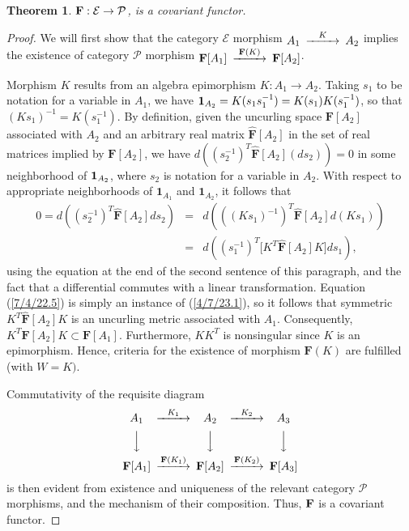 \documentclass{amsart}
\numberwithin{equation}{section}
\newtheorem{theorem}{Theorem}
\theoremstyle{definition}
\numberwithin{theorem}{section}
\begin{document}
\begin{theorem}\label{6/13/22.1}  ${\bf F}: \mathcal{E}\rightarrow \mathcal{P}$, is a covariant functor. 
 \end{theorem}
 \begin{proof}
We will first show that the category $\mathcal{E}$ morphism $ \begin{CD}  A_1 @>K>> A_2\end{CD}$ implies the existence of category $\mathcal{P}$ morphism $ \begin{CD}  {\bf F}[A_1] @>{\bf F}(K)>> {\bf F}[A_2]\end{CD}$.

Morphism $K$ results from an algebra epimorphism $K:A_1\rightarrow A_2$.   Taking $s_1$ to be notation for a variable in $A_1$, we have ${\bf 1}_{A_2} = K(s_1s_1^{-1}) = K(s_1)K(s_1^{-1})$, so that $(Ks_1)^{-1} = K(s_1^{-1})$.  By definition, given the uncurling space $\mathbf{F}[A_2]$ associated with $A_2$ and an arbitrary real matrix  $\hat{\mathbf{F}}[A_2]$ in the set of real matrices implied by $\mathbf{F}[A_2]$, we have $d\left((s_2^{-1})^T\hat{\mathbf{F}}[A_2] (ds_2)\right) = 0$ in some neighborhood of ${\bf 1}_{A_2}$, where $s_2$ is notation for a variable in $A_2$.   With respect to appropriate neighborhoods of $\mathbf{1}_{A_1}$ and $\mathbf{1}_{A_2}$, it follows that \begin{eqnarray}\nonumber 0 = d\left((s_2^{-1})^T\hat{\mathbf{F}}[A_2] ds_2\right) &=&  d\left(((Ks_1)^{-1})^T\hat{\mathbf{F}}[A_2] d(Ks_1)\right) \\  &=& d\left((s_1^{-1})^T \big[K^T \hat{\mathbf{F}}[A_2]K\big]ds_1\right), \label{7/4/22.5}  \end{eqnarray}   using the equation at the end of the second sentence of this paragraph, and the fact that a differential commutes with a linear transformation.  Equation (\ref{7/4/22.5}) is simply an instance of (\ref{4/7/23.1}), so it follows that symmetric $K^T \hat{\mathbf{F}}[A_2]K$ is an uncurling metric associated with $A_1$.  Consequently, $K^T\mathbf{F}[A_2]K\subset \mathbf{F}[A_1]$.  Furthermore, $KK^T$ is nonsingular since $K$ is an epimorphism.  Hence, criteria for the existence of morphism $\mathbf{F}(K)$ are fulfilled (with $W=K)$.

Commutativity of the requisite diagram \enlargethispage{.5cm}
  \[  \begin{CD}  
A_1 @>K_1>> A_2 @>K_2>> A_3\\
 @VVV   @VVV  @VVV\\
 {\bf F}[A_1]   @>{\bf F}(K_1)>>  {\bf F}[A_2]  @>{\bf F}(K_2)>>  {\bf F}[A_3] \\ 
 \end{CD} \]
is then evident from existence and uniqueness of the relevant category $\mathcal{P}$ morphisms, and the mechanism of their composition.  Thus, ${\bf F}$ is a covariant functor. 
\end{proof}
\end{document}
